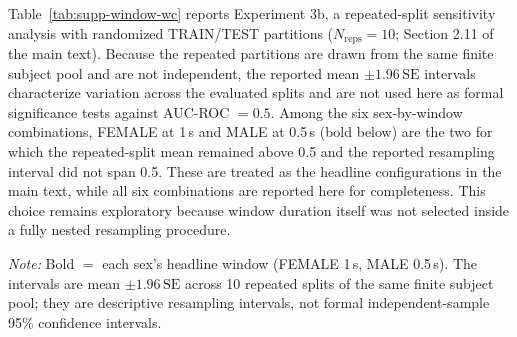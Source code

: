 \documentclass[preprint,12pt]{elsarticle}
\begin{document}
Table~\ref{tab:supp-window-wc} reports Experiment 3b, a repeated-split sensitivity analysis with
randomized TRAIN/TEST partitions ($N_{\text{reps}}=10$; Section 2.11 of the main text). Because
the repeated partitions are drawn from the same finite subject pool and are not independent, the
reported mean $\pm 1.96\,\mathrm{SE}$ intervals characterize variation across the evaluated
splits and are not used here as formal significance tests against AUC-ROC $=0.5$. Among the six
sex-by-window combinations, FEMALE at 1\,s and MALE at 0.5\,s (bold below) are the two for which
the repeated-split mean remained above 0.5 and the reported resampling interval did not span 0.5.
These are treated as the headline configurations in the main text, while all six combinations are
reported here for completeness. This choice remains exploratory because window duration itself was
not selected inside a fully nested resampling procedure.

\begin{table}[H]
\centering
\begin{minipage}{0.75\linewidth}
\captionsetup{justification=raggedright, singlelinecheck=false}
\caption{Repeated-split sensitivity analysis by window duration and sex: AUC-ROC on randomized TRAIN/TEST splits (Experiment 3b, $N_{\text{reps}}=10$), using the corresponding TRAIN-selected within-category architecture reported in Table~\ref{tab:supp-window-best}.}
\label{tab:supp-window-wc}
\par\vspace{0.5em}
{\small\raggedright\emph{Note:} Bold $=$ each sex's headline window (FEMALE 1\,s, MALE 0.5\,s). The intervals are mean $\pm1.96\,\mathrm{SE}$ across 10 repeated splits of the same finite subject pool; they are descriptive resampling intervals, not formal independent-sample 95\% confidence intervals.\par}
\end{minipage}
\end{table}
\end{document}
